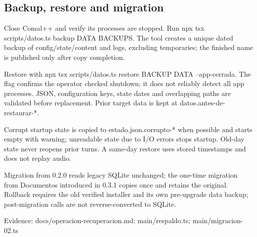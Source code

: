 \subsection{Backup, restore and migration}

Close Comal++ and verify its processes are stopped. Run npx tsx scripts/datos.ts backup DATA BACKUPS. The tool creates a unique dated backup of config/state/content and logs, excluding temporaries; the finished name is published only after copy completion.

Restore with npx tsx scripts/datos.ts restore BACKUP DATA --app-cerrada. The flag confirms the operator checked shutdown; it does not reliably detect all app processes. JSON, configuration keys, state dates and overlapping paths are validated before replacement. Prior target data is kept at datos.antes-de-restaurar-*.

Corrupt startup state is copied to estado.json.corrupto-* when possible and starts empty with warning; unreadable state due to I/O errors stops startup. Old-day state never reopens prior turns. A same-day restore uses stored timestamps and does not replay audio.

Migration from 0.2.0 reads legacy SQLite unchanged; the one-time migration from Documentos introduced in 0.3.1 copies once and retains the original. Rollback requires the old verified installer and its own pre-upgrade data backup; post-migration calls are not reverse-converted to SQLite.

Evidence: docs/operacion-recuperacion.md; main/respaldo.ts; main/migracion-02.ts
